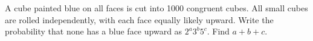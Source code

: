 A cube painted blue on all faces is cut into 1000 congruent cubes. All small cubes are rolled independently, with each face equally likely upward. Write the probability that none has a blue face upward as $2^a3^b5^c$. Find $a+b+c$.
